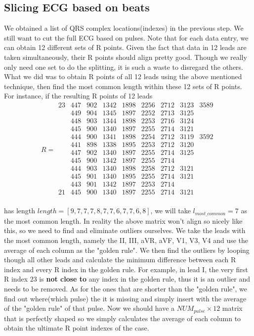 \documentclass[%
 reprint,
 amsmath,amssymb,
 aps,
]{revtex4-2}
\begin{document}
\subsection{Slicing ECG based on beats}
We obtained a list of QRS complex locations(indexes) in the previous step. We still want to cut the full ECG based on pulses. Note that for each data entry, we can obtain 12 different sets of R points. Given the fact that data in 12 leads are taken simultaneously, their R points should align pretty good. Though we really only need one set to do the splitting, it is such a waste to disregard the others. What we did was to obtain R points of all 12 leads using the above mentioned technique, then find the most common length within these 12 sets of R points. For instance, if the resulting R points of 12 leads 
$$R = \begin{matrix}
23&447&902&1342&1898&2256&2712&3123&3589 \\
&449&904&1345&1897&2252&2713&3125 \\
&448&903&1344&1898&2253&2716&3124 \\
&445&900&1340&1897&2255&2714&3121 \\
&444&900&1341&1898&2254&2712&3119&3592 \\
&441&898&1338&1895&2253&2712&3120 \\
&447&902&1340&1897&2255&2714&3125 \\
&445&900&1342&1897&2255&2714 \\
&444&903&1340&1898&2258&2712&3121 \\
&445&901&1340&1895&2255&2714&3121 \\
&443&901&1342&1897&2253&2714 \\
21&445&900&1340&1897&2255&2714&3121 \\
\end{matrix}
$$

has length $length = [9, 7, 7, 7, 8, 7, 7, 6, 7, 7, 6, 8]$, we will take $l_{most\_common} = 7$ as the most common length. In reality the above matrix won't align so nicely like this, so we need to find and eliminate outliers ourselves. We take the leads with the most common length, namely the II, III, aVR, aVF, V1, V3, V4 and use the average of each column as the "golden rule". We then find the outliers by looping though all other leads and calculate the minimum difference between each R index and every R index in the golden rule. For example, in lead I, the very first R index $23$ is \textbf{not close to} any index in the golden rule, thus it is an outlier and needs to be removed. As for the ones that are shorter than the "golden rule", we find out where(which pulse) the it is missing and simply insert with the average of the "golden rule" of that pulse. Now we should have a $NUM_{pulse} \times 12$ matrix that is perfectly shaped so we simply calculates the average of each column to obtain the ultimate R point indexes of the case.
\end{document}
